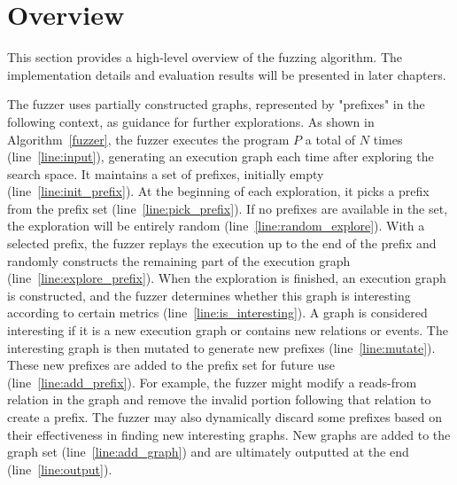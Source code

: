 
\section{Overview}


This section provides a high-level overview of the fuzzing algorithm. The implementation details and evaluation results will be presented in later chapters.


The fuzzer uses partially constructed graphs, represented by "prefixes" in the following context, as guidance for further explorations. As shown in Algorithm~\ref{fuzzer}, the fuzzer executes the program $P$ a total of $N$ times (line~\ref{line:input}), generating an execution graph each time after exploring the search space. It maintains a set of prefixes, initially empty (line~\ref{line:init_prefix}). At the beginning of each exploration, it picks a prefix from the prefix set (line~\ref{line:pick_prefix}). If no prefixes are available in the set, the exploration will be entirely random (line~\ref{line:random_explore}). With a selected prefix, the fuzzer replays the execution up to the end of the prefix and randomly constructs the remaining part of the execution graph (line~\ref{line:explore_prefix}). When the exploration is finished, an execution graph is constructed, and the fuzzer determines whether this graph is interesting according to certain metrics (line~\ref{line:is_interesting}). A graph is considered interesting if it is a new execution graph or contains new relations or events. The interesting graph is then mutated to generate new prefixes (line~\ref{line:mutate}). These new prefixes are added to the prefix set for future use (line~\ref{line:add_prefix}). For example, the fuzzer might modify a reads-from relation in the graph and remove the invalid portion following that relation to create a prefix. The fuzzer may also dynamically discard some prefixes based on their effectiveness in finding new interesting graphs. New graphs are added to the graph set (line~\ref{line:add_graph}) and are ultimately outputted at the end (line~\ref{line:output}). 



